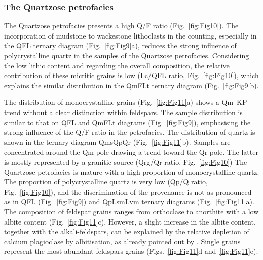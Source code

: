 \documentclass[twoside]{article}
\begin{document}

\subsubsection{The Quartzose petrofacies}

The Quartzose petrofacies presents a high Q/F ratio (Fig.~\ref{fig:Fig10}). The incorporation of mudstone to wackestone lithoclasts in the counting, especially in the QFL ternary diagram (Fig.~\ref{fig:Fig9}a), reduces the strong influence of polycrystalline quartz in the samples of the Quartzose petrofacies. Considering the low lithic content and regarding the overall composition, the relative contribution of these micritic grains is low (Lc/QFL ratio, Fig.~\ref{fig:Fig10}), which explains the similar distribution in the QmFLt ternary diagram (Fig.~\ref{fig:Fig9}b).\par
\medskip
The distribution of monocrystalline grains (Fig.~\ref{fig:Fig11}a) shows a Qm–KP trend without a clear distinction within feldspars. The sample distribution is similar to that on QFL and QmFLt diagrams (Fig.~\ref{fig:Fig9}), emphasising the strong influence of the Q/F ratio in the petrofacies. The distribution of quartz is shown in the ternary diagram QmsQpQr (Fig.~\ref{fig:Fig11}b). Samples are concentrated around the Qm pole drawing a trend toward the Qr pole. The latter is mostly represented by a granitic source (Qrg/Qr ratio, Fig.~\ref{fig:Fig10}) The Quartzose petrofacies is mature with a high proportion of monocrystalline quartz. The proportion of polycrystalline quartz is very low (Qp/Q ratio, Fig.~\ref{fig:Fig10}), and the discrimination of the provenance is not as pronounced as in QFL (Fig.~\ref{fig:Fig9}) and QpLsmLvm ternary diagrams (Fig.~\ref{fig:Fig11}a). The composition of feldspar grains ranges from orthoclase to anorthite with a low albite content (Fig.~\ref{fig:Fig11}c). However, a slight increase in the albite content, together with the alkali-feldspars, can be explained by the relative depletion of calcium plagioclase by albitisation, as already pointed out by \cite{Morad1990}. Single grains represent the most abundant feldspars grains (Figs.~\ref{fig:Fig11}d and~\ref{fig:Fig11}e).\par
\medskip
\end{document}
